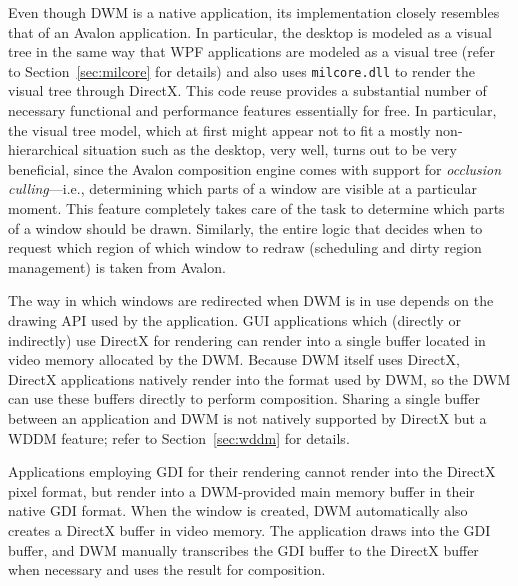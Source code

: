 \documentclass[10pt,twocolumn,a4paper,os=win]{article}
\begin{document}
			Even though DWM is a native application, its implementation closely
			resembles that of an Avalon application. In particular, the desktop
			is modeled as a visual tree in the same way that WPF applications
			are modeled as a visual tree (refer to Section~\ref{sec:milcore}
			for details) and also uses \texttt{milcore.dll} to render the
			visual tree through DirectX. This code reuse provides a
			substantial number of necessary functional and performance
			features essentially for free.  In particular, the visual tree
			model, which at first might appear not to fit a mostly
			non-hierarchical situation such as the desktop, very well,
			turns out to be very beneficial, since the Avalon composition
			engine comes with support for \emph{occlusion culling}---i.e.,
			determining which parts of a window are visible at a particular
			moment. This feature completely takes care of the task to
			determine which parts of a window should be drawn. Similarly, the
			entire logic that decides when to request which region of which window
			to redraw (scheduling and dirty region management) is taken from
			Avalon.
			\cite{dwmwpf}

			The way in which windows are redirected when DWM is in use depends
			on the drawing API used by the application. GUI applications which
			(directly or indirectly)
			use DirectX for rendering can render into a single buffer located
			in video memory allocated
			by the DWM. Because DWM itself uses DirectX, DirectX applications
			natively render into the format used by DWM, so the DWM can use
			these buffers directly to perform composition. Sharing a single buffer
			between an application and DWM is not natively supported by DirectX
			but a WDDM feature; refer to Section~\ref{sec:wddm} for details.
			\cite{dwmredirect}

			Applications employing GDI for their rendering cannot render into
			the DirectX pixel format, but render into a DWM-provided main memory
			buffer in their native GDI format. When the window is created, DWM
			automatically also creates a DirectX buffer in video memory. The
			application draws into the GDI buffer, and DWM manually transcribes
			the GDI buffer to the DirectX buffer when necessary and uses the result
			for composition.
			\cite{dwmredirect}
\end{document}
